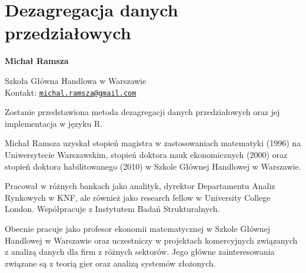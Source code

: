 \documentclass[\main/boa.tex]{subfiles}
\begin{document}
\section{Dezagregacja danych przedziałowych}


\begin{minipage}{0.915\textwidth}
	\centering
  {\bf \LARGE {} Michał Ramsza}
\end{minipage}


\begin{affiliations}
\begin{minipage}{0.915\textwidth}
\centering
\large Szkoła Główna Handlowa w Warszawie \\[1pt]
Kontakt: \href{mailto:michal.ramsza@gmail.com}{\nolinkurl{michal.ramsza@gmail.com}}\\
\end{minipage}
\end{affiliations}


Zostanie przedstawiona metoda dezagregacji danych przedziałowych oraz jej implementacja w języku R. 

\bio
Michał Ramsza uzyskał stopień magistra w zastosowaniach matematyki (1996) na Uniwersytecie Warszawskim, stopień doktora nauk ekonomicznych (2000) oraz stopień doktora habilitowanego (2010) w Szkole Głównej Handlowej w Warszawie.

Pracował w różnych bankach jako analityk, dyrektor Departamentu Analiz Rynkowych w KNF, ale również jako research fellow w University College London. Współpracuje z Instytutem Badań Strukturalnych.

Obecnie pracuje jako profesor ekonomii matematycznej w Szkole Głównej Handlowej w Warszawie oraz uczestniczy w projektach komercyjnych związanych z analizą danych dla firm z różnych sektorów. Jego główne zainteresowania związane są z teorią gier oraz analizą systemów złożonych.
\end{document}
